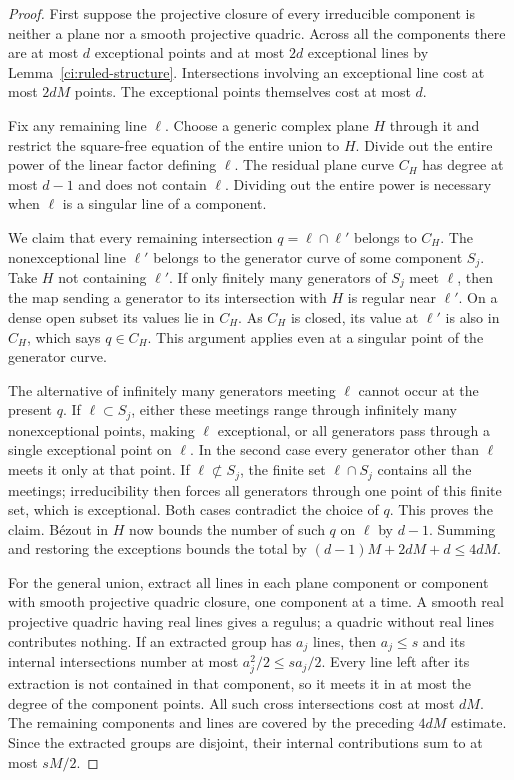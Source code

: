 \begin{proof}
First suppose the projective closure of every irreducible component
is neither a plane nor a smooth projective quadric.  Across all
the components there are at most $d$
exceptional points and at most $2d$ exceptional lines by
Lemma~\ref{ci:ruled-structure}.  Intersections involving an
exceptional line cost at most $2dM$ points.  The exceptional points
themselves cost at most $d$.

Fix any remaining line $\ell$.  Choose a generic complex plane
$H$ through it and restrict the square-free equation of the entire
union to $H$.  Divide out the entire power of the linear factor
defining $\ell$.  The residual plane curve $C_H$ has degree at
most $d-1$ and does not contain $\ell$.  Dividing out the entire
power is necessary when $\ell$ is a singular line of a component.

We claim that every remaining intersection $q=\ell\cap\ell'$
belongs to $C_H$.  The nonexceptional line $\ell'$ belongs to the
generator curve of some component $S_j$.  Take $H$ not containing
$\ell'$.  If only finitely many generators of $S_j$ meet $\ell$,
then the map sending a generator to its intersection with $H$
is regular near $\ell'$.  On a dense open subset its values lie
in $C_H$.  As $C_H$ is closed, its value at $\ell'$ is also in
$C_H$, which says $q\in C_H$.  This argument applies even at a
singular point of the generator curve.

The alternative of infinitely many generators meeting $\ell$
cannot occur at the present $q$.  If $\ell\subset S_j$, either
these meetings range through infinitely many nonexceptional
points, making $\ell$ exceptional, or all generators pass through
a single exceptional point on $\ell$.  In the second case every
generator other than $\ell$ meets it only at that point.  If
$\ell\not\subset S_j$, the finite set $\ell\cap S_j$ contains
all the meetings; irreducibility then forces all generators
through one point of this finite set, which is exceptional.
Both cases contradict the choice of $q$.  This proves the claim.
B\'ezout in $H$ now bounds the number of such $q$ on $\ell$ by
$d-1$.  Summing and restoring the exceptions bounds the total by
$(d-1)M+2dM+d\le4dM$.

For the general union, extract all lines in each plane component
or component with smooth projective quadric closure, one component
at a time.  A smooth real projective quadric having real lines
gives a regulus; a quadric without real
lines contributes nothing.  If an extracted group has $a_j$
lines, then $a_j\le s$ and its internal intersections number at
most $a_j^2/2\le s a_j/2$.  Every line left after its extraction
is not contained in that component, so it meets it in at most
the degree of the component points.  All such cross intersections
cost at most $dM$.  The remaining components and lines are covered
by the preceding $4dM$ estimate.  Since the extracted groups are
disjoint, their internal contributions sum to at most $sM/2$.
\end{proof}

